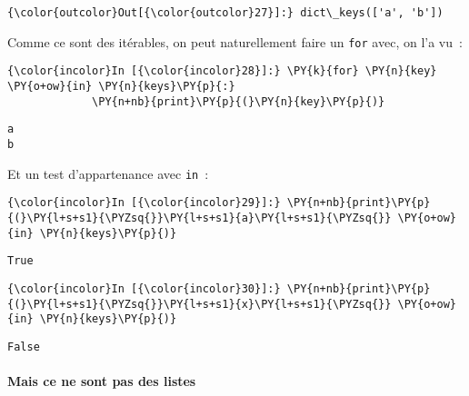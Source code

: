\begin{Verbatim}[commandchars=\\\{\}]
{\color{outcolor}Out[{\color{outcolor}27}]:} dict\_keys(['a', 'b'])
\end{Verbatim}
            
    Comme ce sont des itérables, on peut naturellement faire un \texttt{for}
avec, on l'a vu~:

    \begin{Verbatim}[commandchars=\\\{\}]
{\color{incolor}In [{\color{incolor}28}]:} \PY{k}{for} \PY{n}{key} \PY{o+ow}{in} \PY{n}{keys}\PY{p}{:}
             \PY{n+nb}{print}\PY{p}{(}\PY{n}{key}\PY{p}{)}
\end{Verbatim}


    \begin{Verbatim}[commandchars=\\\{\}]
a
b

    \end{Verbatim}

    Et un test d'appartenance avec \texttt{in}~:

    \begin{Verbatim}[commandchars=\\\{\}]
{\color{incolor}In [{\color{incolor}29}]:} \PY{n+nb}{print}\PY{p}{(}\PY{l+s+s1}{\PYZsq{}}\PY{l+s+s1}{a}\PY{l+s+s1}{\PYZsq{}} \PY{o+ow}{in} \PY{n}{keys}\PY{p}{)}
\end{Verbatim}


    \begin{Verbatim}[commandchars=\\\{\}]
True

    \end{Verbatim}

    \begin{Verbatim}[commandchars=\\\{\}]
{\color{incolor}In [{\color{incolor}30}]:} \PY{n+nb}{print}\PY{p}{(}\PY{l+s+s1}{\PYZsq{}}\PY{l+s+s1}{x}\PY{l+s+s1}{\PYZsq{}} \PY{o+ow}{in} \PY{n}{keys}\PY{p}{)}
\end{Verbatim}


    \begin{Verbatim}[commandchars=\\\{\}]
False

    \end{Verbatim}

    \hypertarget{mais-ce-ne-sont-pas-des-listes}{%
\paragraph{\texorpdfstring{Mais \textbf{ce ne sont pas des
listes}}{Mais ce ne sont pas des listes}}\label{mais-ce-ne-sont-pas-des-listes}}

